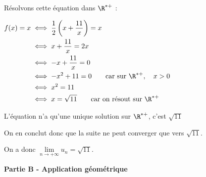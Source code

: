 \begin{enumerate}
Résolvons cette équation dans $\R^{*+}$ :

$\aligned  f(x) = x &\iff \dfrac{1}{2}\left(x + \dfrac{11}{x}\right) = x\\
&\iff x+ \dfrac{11}{x} = 2x\\
&\iff -x + \dfrac{11}{x} = 0\\
&\iff -x^2 + 11 = 0 \qquad \text{car sur }\R^{*+}, \quad x>0\\
&\iff x^2 = 11\\
&\iff x = \sqrt{11} \qquad \text{car on résout sur }\R^{*+}		\\ \endaligned$

L'équation n'a qu'une unique solution sur $\R^{*+}$, c'est $\sqrt{11}$

On en conclut donc que la suite ne peut converger que vers $\sqrt{11}$.

On a donc $\lim\limits_{n \to +\infty} u_n = \sqrt{11}$.
\end{enumerate}

\medskip

\textbf{Partie B - Application géométrique}

\medskip

